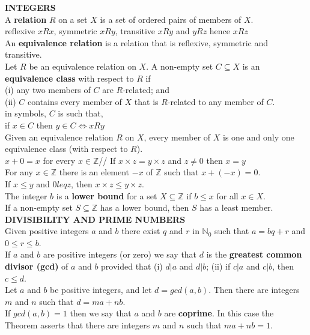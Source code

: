 \documentclass[10pt,landscape]{article}
\begin{document}
\begin{multicols}{4}
\textbf{INTEGERS}\\
A \textbf{relation} $R$ on a set $X$ is a set of ordered pairs of members of $X$.\\
reflexive $xRx$, symmetric $xRy$, transitive $xRy$ and $yRz$ hence $xRz$\\
An \textbf{equivalence relation} is a relation that is reflexive, symmetric and transitive.\\
Let $R$ be an equivalence relation on $X$. A non-empty set $C \subseteq X$ is an \textbf{equivalence class} with respect to $R$ if\\
(i) any two members of $C$ are $R$-related; and\\
(ii) $C$ contains every member of $X$ that is $R$-related to any member of $C$.\\
in symbols, $C$ is such that,\\
if $x \in C$ then $y \in C \iff xRy$\\ 
Given an equivalence relation $R$ on $X$, every member of $X$ is one and only one equivalence class (with respect to $R$).\\
$x + 0 = x$ for every $x \in \mathbb{Z}$//
If $x \times z = y \times z$ and $z \neq 0$ then $x = y$\\
For any $x \in \mathbb{Z}$ there is an element $-x$ of $\mathbb{Z}$ such that $x +(-x)=0$.\\
If $x \leq y$ and $0 leq z$, then $x \times z \leq y \times z$.\\
The integer $b$ is a \textbf{lower bound} for a set $X \subseteq \mathbb{Z}$ if $b \leq x$ for all $x \in X$.\\
If a non-empty set $S \subseteq \mathbb{Z}$ has a lower bound, then $S$ has a least member.\\
\textbf{DIVISIBILITY AND PRIME NUMBERS}\\
Given positive integers $a$ and $b$ there exist $q$ and $r$ in $\mathbb{N}_0$ such that $a = bq + r$ and $0 \leq r \leq b$. \\
If $a$ and $b$ are positive integers (or zero) we say that $d$ is the \textbf{greatest common divisor (gcd)} of $a$ and $b$ provided that (i) $d|a$ and $d|b$; (ii) if $c|a$ and $c|b$, then $c \leq d$.\\
Let $a$ and $b$ be positive integers, and let $d = gcd(a,b)$. Then there are integers $m$ and $n$ such that $d = ma + nb$.\\
If $gcd(a,b) = 1$ then we say that $a$ and $b$ are \textbf{coprime}. In this case the Theorem asserts that there are integers $m$ and $n$ such that $ma + nb = 1$.\\

\end{multicols}
\end{document}
